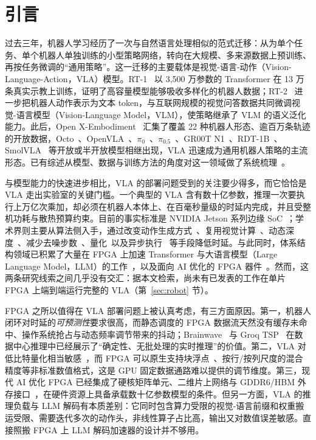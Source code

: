 \documentclass[a4paper,10.5pt]{ctexart}
\newcommand{\pizero}{$\pi_0$}
\newcommand{\pihalf}{$\pi_{0.5}$}
\begin{document}
\section{引言}\label{sec:intro}

过去三年，机器人学习经历了一次与自然语言处理相似的范式迁移：从为单个任务、单个机器人单独训练的小型策略网络，转向在大规模、多来源数据上预训练、再按任务微调的“通用策略”。这一迁移的主要载体是视觉-语言-动作（Vision-Language-Action，VLA）模型。RT-1~\cite{rt1} 以 3,500 万参数的 Transformer 在 13 万条真实示教上训练，证明了高容量模型能够吸收多样化的机器人数据；RT-2~\cite{rt2} 进一步把机器人动作表示为文本 token，与互联网规模的视觉问答数据共同微调视觉-语言模型（Vision-Language Model，VLM），使策略继承了 VLM 的语义泛化能力。此后，Open X-Embodiment~\cite{oxe} 汇集了覆盖 22 种机器人形态、逾百万条轨迹的开放数据，Octo~\cite{octo}、OpenVLA~\cite{openvla}、\pizero~\cite{pi0}、\pihalf~\cite{pi05}、GR00T N1~\cite{gr00t}、RDT-1B~\cite{rdt}、SmolVLA~\cite{smolvla} 等开放或半开放模型相继出现，VLA 迅速成为通用机器人策略的主流形态。已有综述从模型、数据与训练方法的角度对这一领域做了系统梳理~\cite{survey_vla,survey_effvla}。

与模型能力的快速进步相比，VLA 的部署问题受到的关注要少得多，而它恰恰是 VLA 走出实验室的关键门槛。一个典型的 VLA 含有数十亿参数，推理一次要执行上万亿次乘加，却必须在机器人本体上、在百毫秒量级的时延内完成，并且受整机功耗与散热预算约束。目前的事实标准是 NVIDIA Jetson 系列边缘 SoC~\cite{thor}；学术界则主要从算法侧入手，通过改变动作生成方式~\cite{openvlaoft,fast}、复用视觉计算~\cite{vlacache}、动态深度~\cite{deervla}、减少去噪步数~\cite{consistencypolicy,lightdp}、量化~\cite{vlaquantbench,holoq}以及异步执行~\cite{rtc} 等手段降低时延。与此同时，体系结构领域已积累了大量在 FPGA 上加速 Transformer 与大语言模型（Large Language Model，LLM）的工作~\cite{ftrans,dfx,flightllm,chen2024trets,hlstransform,edgellm,survey_llmhw,survey_fpga_tf}，以及面向 AI 优化的 FPGA 器件~\cite{s10nx_fpga21,versal_fpga19,achronix}。然而，这两条研究线索之间几乎没有交汇：据本文检索，尚未有已发表的工作在单片 FPGA 上端到端运行完整的 VLA（第~\ref{sec:robot} 节）。

FPGA 之所以值得在 VLA 部署问题上被认真考虑，有三方面原因。第一，机器人闭环对时延的\emph{可预测性}要求很高，而静态调度的 FPGA 数据流天然没有缓存未命中、操作系统抢占与动态频率调节带来的抖动；Brainwave~\cite{brainwave} 与 Groq TSP~\cite{groq} 在数据中心推理中已经展示了“确定性、无批处理的实时推理”的价值。第二，VLA 对低比特量化相当敏感~\cite{vlaquantbench}，而 FPGA 可以原生支持块浮点~\cite{msfp,mx}、按行/按列尺度的混合精度等非标准数值格式，这是 GPU 固定数据通路难以提供的调节维度。第三，现代 AI 优化 FPGA 已经集成了硬核矩阵单元、二维片上网络与 GDDR6/HBM 外存接口~\cite{s10nx_fpga21,achronix}，在硬件资源上具备承载数十亿参数模型的条件。但另一方面，VLA 的推理负载与 LLM 解码有本质差别：它同时包含算力受限的视觉-语言前缀和权重搬运受限、需要迭代多次的动作头，非线性算子占比高，输出又对数值误差敏感。直接照搬 FPGA 上 LLM 解码加速器的设计并不够用。
\end{document}
